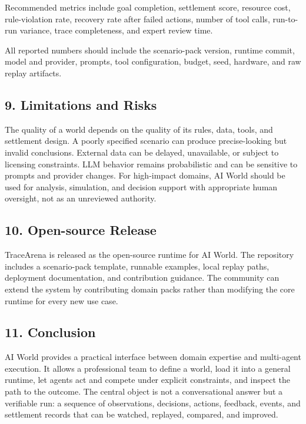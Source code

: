 \documentclass[
]{article}
\begin{document}
Recommended metrics include goal completion, settlement score, resource
cost, rule-violation rate, recovery rate after failed actions, number of
tool calls, run-to-run variance, trace completeness, and expert review
time.

All reported numbers should include the scenario-pack version, runtime
commit, model and provider, prompts, tool configuration, budget, seed,
hardware, and raw replay artifacts.

\subsection{9. Limitations and Risks}\label{9-limitations-and-risks}

The quality of a world depends on the quality of its rules, data, tools,
and settlement design. A poorly specified scenario can produce
precise-looking but invalid conclusions. External data can be delayed,
unavailable, or subject to licensing constraints. LLM behavior remains
probabilistic and can be sensitive to prompts and provider changes. For
high-impact domains, AI World should be used for analysis, simulation,
and decision support with appropriate human oversight, not as an
unreviewed authority.

\subsection{10. Open-source Release}\label{10-open-source-release}

TraceArena is released as the open-source runtime for AI World. The
repository includes a scenario-pack template, runnable examples, local
replay paths, deployment documentation, and contribution guidance. The
community can extend the system by contributing domain packs rather than
modifying the core runtime for every new use case.

\subsection{11. Conclusion}\label{11-conclusion}

AI World provides a practical interface between domain expertise and
multi-agent execution. It allows a professional team to define a world,
load it into a general runtime, let agents act and compete under
explicit constraints, and inspect the path to the outcome. The central
object is not a conversational answer but a verifiable run: a sequence
of observations, decisions, actions, feedback, events, and settlement
records that can be watched, replayed, compared, and improved.
\end{document}

